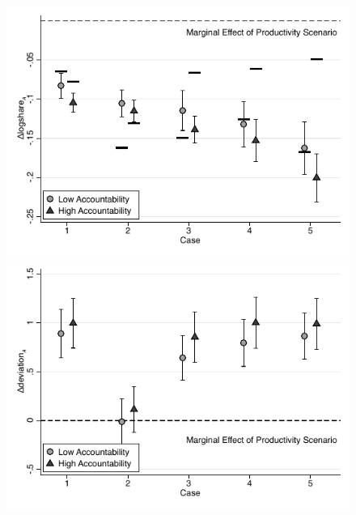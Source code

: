 \documentclass[smallcondensed]{svjour3}
\begin{document}
\begin{figure}[ht!]
   \centering
   \includegraphics[scale=0.4]{figures/main_marg_share_scenario.pdf}\includegraphics[scale=0.4]{figures/main_marg_deviation_scenario.pdf}

\end{figure}
\end{document}
